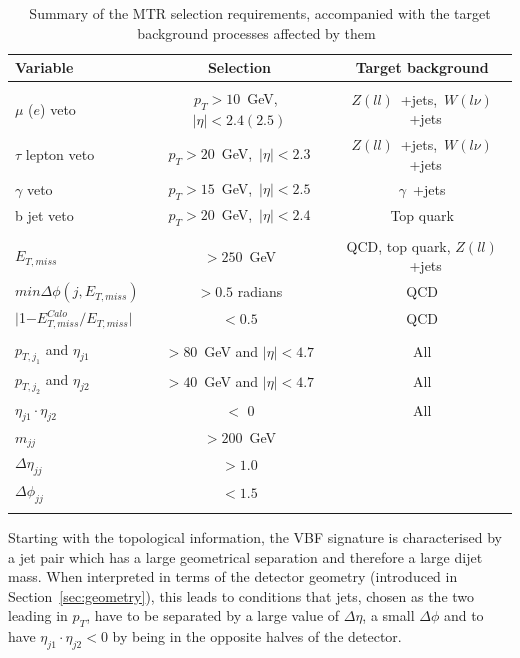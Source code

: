 \begin{table}[htbp]
\centering
\begin{tabular}{lcc}
    Variable                           & Selection                       & Target background \\
    \hline
    & & \\
    $\mu$ ($e$) veto               & $p_T > 10$~GeV,~$|\eta| < 2.4 (2.5)$  & $Z(ll)$~+jets,~$W(l\nu)$~+jets \\
    $\tau$ lepton veto                 & $p_T > 20$~GeV,~$|\eta| < 2.3$        & $Z(ll)$~+jets,~$W(l\nu)$~+jets  \\
    $\gamma$ veto                        & $p_T > 15$~GeV,~$|\eta| < 2.5$        & $\gamma$~+jets \\
    b jet veto                    &  $p_T > 20$~GeV,~$|\eta| < 2.4$  &  Top quark\\
        & & \\
    $E_{T,miss}$                          & ${>} 250$~GeV                          & QCD, top quark, $Z(ll)$~+jets \\
    $min\Delta\phi(j, E_{T,miss})$   &  $ {>} 0.5$ radians               & QCD \\
    $|$1$-E_{T,miss}^{Calo}/E_{T,miss}|$   &  $ {<} 0.5$               & QCD \\
        & & \\
    $p_{T,j_1}$ and $\eta_{j1}$   & ${>} 80$~GeV and $ |\eta| < 4.7$      & All \\
    $p_{T,j_2}$ and $\eta_{j2}$   & ${>} 40$~GeV and $ |\eta| < 4.7$      & All \\
    $\eta_{j1}\cdot\eta_{j2}$   & ${<}$ 0   & All \\

    $m_{jj}$                               & ${>} 200$~GeV  \\       
    $\Delta\eta_{jj}$                            & ${>} 1.0$  \\
    $\Delta\phi_{jj}$                            & ${<} 1.5$  \\
        & & \\
         \hline
\end{tabular}
\caption{Summary of the MTR selection requirements, accompanied with the target background processes affected by them~\cite{note:AN_19_257}}
\label{tab:selection_mtr}
\end{table}

\hspace{10pt} Starting with the topological information, the VBF signature is characterised by a jet pair which has a large geometrical separation and therefore a large dijet mass. When interpreted in terms of the detector geometry (introduced in Section~\ref{sec:geometry}), this leads to conditions that jets, chosen as the two leading in $p_T$, have to be separated by a large value of $\Delta \eta$, a small $\Delta \phi$ and to have $\eta_{j1}\cdot\eta_{j2}<0$ by being in the opposite halves of the detector.


